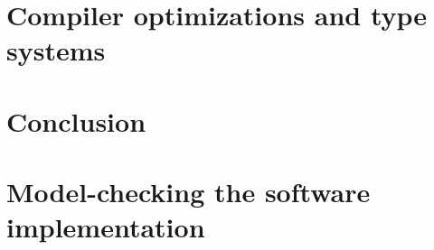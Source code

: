 \documentclass{phd-thesis}
\begin{document}
\chapter[Optimizations and type systems]{Compiler optimizations and type systems}


\chapter{Conclusion}


\appendix
\chapter[Model-checking the implementation]{Model-checking the software implementation}\label{sec:full-model}


%


\backmatter

\printindex
\end{document}
